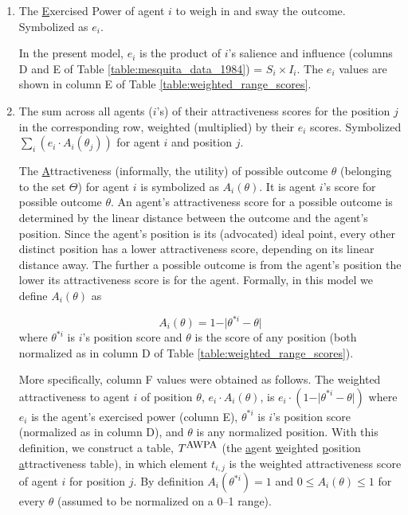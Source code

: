 \begin{enumerate}
\item The \underline{E}xercised Power of agent $i$ to weigh in and sway the outcome. Symbolized as $e_i$.  %

In the present model, $e_i$ is the product of $i$'s   {salience} and   {influence} (columns D and E of Table 
\ref{table:mesquita_data_1984}) = $S_i\times I_i$. The $e_i$ values are shown in column E of Table \ref{table:weighted_range_scores}. 


\item  The sum across all agents ($i$'s) of their   {attractiveness} scores for the   {position} $j$ in the corresponding row, weighted (multiplied) by their $e_i$ scores. Symbolized $\sum_i (e_i\cdot A_i(\theta_j))$ for agent $i$ and position $j$.

The \underline{A}ttractiveness (informally, the utility) of possible outcome $\theta$ (belonging to the set $\Theta$) for agent $i$ is symbolized as $A_i(\theta)$. It is agent $i$'s score for possible outcome $\theta$. An agent's   {attractiveness} score for a possible outcome is determined by the linear distance between the outcome and the agent's   {position}. Since the agent's   {position} is its (advocated) ideal point, every other distinct position has a lower   {attractiveness} score, depending on its linear distance away. The further a possible outcome is from the agent's   {position} the lower its   {attractiveness} score is for the agent. Formally, in this model we define $A_i(\theta)$ as

\begin{equation}
A_i(\theta) = 1-\vert \theta^{*i} - \theta\vert 
\end{equation}
 where $\theta^{*i}$ is $i$'s   {position} score and $\theta$ is the score of any   {position} (both normalized as in column D of Table \ref{table:weighted_range_scores}). %
 
 More specifically, column F values were obtained as follows.  The weighted   {attractiveness} to agent $i$ of   {position} $\theta$, $e_i\cdot A_i(\theta)$, is $e_i\cdot (1-\vert \theta^{*i} - \theta\vert)$ where $e_i$ is the agent's   {exercised power} (column E), $\theta^{*i}$ is $i$'s   {position} score (normalized as in column D), and $\theta$ is any normalized   {position}. With this definition, we construct a table, $T^{\mbox{\small AWPA}}$ (the \underline{a}gent \underline{w}eighted \underline{p}osition \underline{a}ttractiveness table), %
 in which element $t_{i,j}$ is the weighted   {attractiveness}  score of agent $i$ for   {position} $j$.  By definition $A_i(\theta^{*i}) = 1$ and $0 \le A_i(\theta) \le 1$ for every $\theta$ (assumed to be normalized on a 0--1 range).


\end{enumerate}
